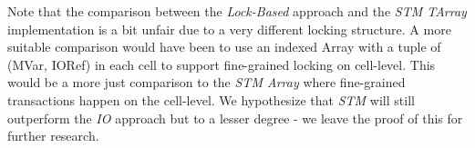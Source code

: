 Note that the comparison between the \textit{Lock-Based} approach and the \textit{STM TArray} implementation is a bit unfair due to a very different locking structure. A more suitable comparison would have been to use an indexed Array with a tuple of (MVar, IORef) in each cell to support fine-grained locking on cell-level. This would be a more just comparison to the \textit{STM Array} where fine-grained transactions happen on the cell-level. We hypothesize that \textit{STM} will still outperform the \textit{IO} approach but to a lesser degree - we leave the proof of this for further research.


